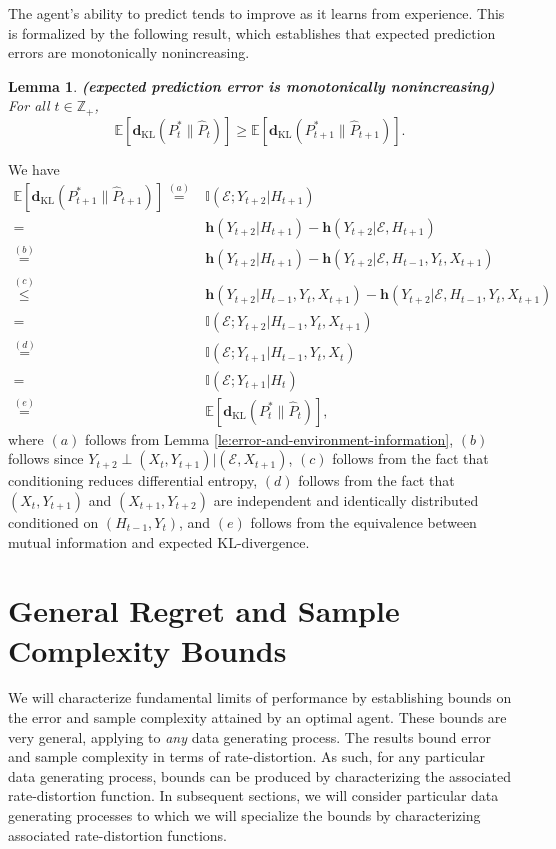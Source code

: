 \documentclass[twoside,11pt]{article}
\renewenvironment{proof}{\par\noindent{\bf Proof\ }}{\hfill\BlackBox\\[2mm]}
\newenvironment{proof}{\par\noindent{\bf Proof\ }}{\hfill\BlackBox\\[2mm]}
\newtheorem{lemma}[theorem]{Lemma}
\def\environment{\mathcal{E}}
\def\KL{\mathbf{d}_{\mathrm{KL}}}
\def\diffentropy{\bf h}
\def\E{\mathbb{E}}
\def\diffentropy{\mathbf{h}}
\def\I{\mathbb{I}}
\begin{document}
The agent's ability to predict tends to improve as it learns from experience.  This is formalized by the following result, which establishes that expected prediction errors are monotonically nonincreasing.
\begin{lemma}
    \label{le:monotonic-error}
    {\bf (expected prediction error is monotonically nonincreasing)}
    For all $t \in \mathbb{Z}_+$,
    $$\E[\KL(P^*_t \| \hat{P}_t)] \geq \E[\KL(P^*_{t+1} \| \hat{P}_{t+1})].$$
\end{lemma}
\begin{proof}
    We have
    \begin{align*}
        \E[\KL(P^*_{t+1} \| \hat{P}_{t+1})]
        \overset{(a)}{=}& \I(\environment; Y_{t+2} | H_{t+1})\\
        =& \diffentropy(Y_{t+2}|H_{t+1}) - \diffentropy(Y_{t+2}|\environment, H_{t+1})\\
        \overset{(b)}{=}& \diffentropy(Y_{t+2}|H_{t+1}) - \diffentropy(Y_{t+2}|\environment, H_{t-1}, Y_t, X_{t+1})\\
        \overset{(c)}{\leq}& \diffentropy(Y_{t+2}|H_{t-1}, Y_t, X_{t+1}) - \diffentropy(Y_{t+2}|\environment, H_{t-1}, Y_t, X_{t+1})\\
        =& \I(\environment; Y_{t+2} | H_{t-1}, Y_{t}, X_{t+1}) \\
        \overset{(d)}{=}& \I(\environment; Y_{t+1} | H_{t-1}, Y_t, X_t) \\
        =& \I(\environment; Y_{t+1} | H_t) \\
        \overset{(e)}{=}& \E[\KL(P^*_t \| \hat{P}_t)],
    \end{align*}
    where $(a)$ follows from Lemma \ref{le:error-and-environment-information}, $(b)$ follows since $Y_{t+2} \perp (X_{t}, Y_{t+1})|(\environment, X_{t+1})$, $(c)$ follows from the fact that conditioning reduces differential entropy, $(d)$ follows from the fact that $(X_t, Y_{t+1})$ and $(X_{t+1}, Y_{t+2})$ are independent and identically distributed conditioned on $(H_{t-1}, Y_t)$, and $(e)$ follows from the equivalence between mutual information and expected KL-divergence.
\end{proof}

\section{General Regret and Sample Complexity Bounds}
We will characterize fundamental limits of performance by establishing bounds on the error and sample complexity attained by an optimal agent.  These bounds are very general, applying to {\it any} data generating process.  The results bound error and sample complexity in terms of rate-distortion.  As such, for any particular data generating process, bounds can be produced by characterizing the associated rate-distortion function.  In subsequent sections, we will consider particular data generating processes to which we will specialize the bounds by characterizing associated rate-distortion functions.
\end{document}
